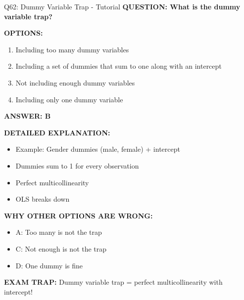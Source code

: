 \documentclass[8pt]{beamer}
\begin{document}
	\begin{frame}{Q62: Dummy Variable Trap - Tutorial}
		\fontsize{6.5}{7.5}\selectfont
		\textbf{QUESTION: What is the dummy variable trap?}
		
		\vspace{0.1cm}
		\textbf{OPTIONS:}
		\begin{enumerate}
			\item Including too many dummy variables
			\item Including a set of dummies that sum to one along with an intercept
			\item Not including enough dummy variables
			\item Including only one dummy variable
		\end{enumerate}
		
		\vspace{0.1cm}
		\textcolor{myblue}{\textbf{ANSWER: B}}
		
		\vspace{0.1cm}
		\textbf{DETAILED EXPLANATION:}
		\begin{itemize}
			\item Example: Gender dummies (male, female) + intercept
			\item Dummies sum to 1 for every observation
			\item Perfect multicollinearity
			\item OLS breaks down
		\end{itemize}
		
		\vspace{0.1cm}
		\textcolor{myred}{\textbf{WHY OTHER OPTIONS ARE WRONG:}}
		\begin{itemize}
			\item \textcolor{myred}{A:} Too many is not the trap
			\item \textcolor{myred}{C:} Not enough is not the trap
			\item \textcolor{myred}{D:} One dummy is fine
		\end{itemize}
		
		\textcolor{myred}{\textbf{EXAM TRAP:}} Dummy variable trap = \textcolor{myblue}{perfect multicollinearity} with intercept!
	\end{frame}
	
\end{document}
